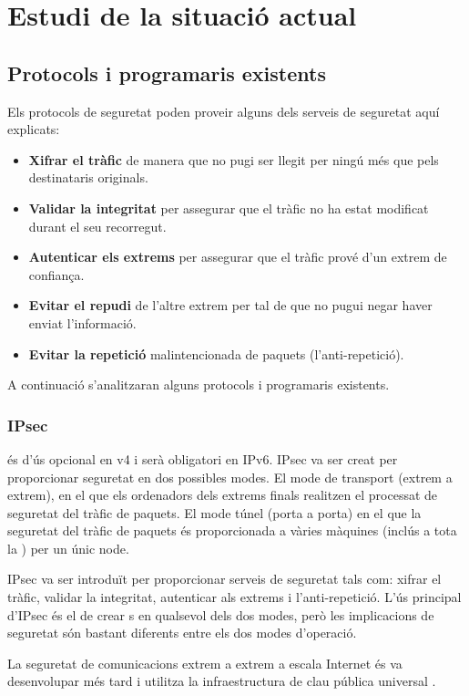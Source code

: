 \chapter{Estudi de la situació actual}
\section{Protocols i programaris existents}
Els protocols de seguretat poden proveir alguns dels serveis de seguretat aquí explicats:
\begin{itemize}
\item \textbf{Xifrar el tràfic} de manera que no pugi ser llegit per ningú més que pels destinataris originals.
\item \textbf{Validar la integritat} per assegurar que el tràfic no ha estat modificat durant el seu recorregut.
\item \textbf{Autenticar els extrems} per assegurar que el tràfic prové d'un extrem de confiança.
\item \textbf{Evitar el repudi} de l'altre extrem per tal de que no pugui negar haver enviat l'informació.
\item \textbf{Evitar la repetició} malintencionada de paquets (l'anti-repetició).
\end{itemize}

A continuació s'analitzaran alguns protocols i programaris existents.
\subsection{IPsec}
 és d'ús opcional en v4 i serà obligatori en IPv6. IPsec va ser creat per proporcionar seguretat en dos possibles modes. El mode de transport (extrem a extrem), en el que els ordenadors dels extrems finals realitzen el processat de seguretat del tràfic de paquets. El mode túnel (porta a porta) en el que la seguretat del tràfic de paquets és proporcionada a vàries màquines (inclús a tota la ) per un únic node.

IPsec va ser introduït per proporcionar serveis de seguretat tals com: xifrar el tràfic, validar la integritat, autenticar als extrems i l'anti-repetició. L'ús principal d'IPsec és el de crear s en qualsevol dels dos modes, però les implicacions de seguretat són bastant diferents entre els dos modes d'operació.

La seguretat de comunicacions extrem a extrem a escala Internet és va desenvolupar més tard i utilitza la infraestructura de clau pública universal .

